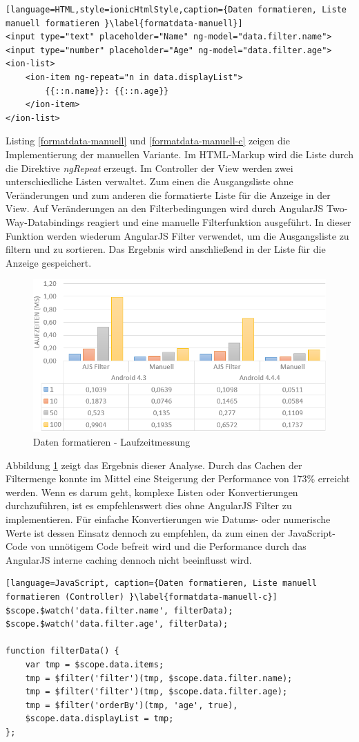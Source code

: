 \begin{lstlisting}[language=HTML,style=ionicHtmlStyle,caption={Daten formatieren, Liste manuell formatieren }\label{formatdata-manuell}]
<input type="text" placeholder="Name" ng-model="data.filter.name">
<input type="number" placeholder="Age" ng-model="data.filter.age">
<ion-list>
	<ion-item ng-repeat="n in data.displayList">
		{{::n.name}}: {{::n.age}}
	</ion-item>
</ion-list>
\end{lstlisting}  
Listing \ref{formatdata-manuell} und \ref{formatdata-manuell-c} zeigen die Implementierung der manuellen Variante. Im HTML-Markup wird die Liste durch die Direktive \emph{ngRepeat} erzeugt. Im Controller der View werden zwei unterschiedliche Listen verwaltet. Zum einen die Ausgangsliste ohne Veränderungen und zum anderen die formatierte Liste für die Anzeige in der View. Auf Veränderungen an den Filterbedingungen wird durch AngularJS Two-Way-Databindings reagiert und eine manuelle Filterfunktion ausgeführt. In dieser Funktion werden wiederum AngularJS Filter verwendet, um die Ausgangsliste zu filtern und zu sortieren. Das Ergebnis wird anschließend in der Liste für die Anzeige gespeichert.
\begin{figure}[h]
	\centering
	\includegraphics[scale=0.5]{Bilder/Diagramme/Filter.png}
	\caption{Daten formatieren - Laufzeitmessung}
	\label{filter-measurement}
\end{figure}
Abbildung \ref{filter-measurement} zeigt das Ergebnis dieser Analyse. Durch das Cachen der Filtermenge konnte im Mittel eine Steigerung der Performance von 173\% erreicht werden. Wenn es darum geht, komplexe Listen oder Konvertierungen durchzuführen, ist es empfehlenswert dies ohne AngularJS Filter zu implementieren. Für einfache Konvertierungen wie Datums- oder numerische Werte ist dessen Einsatz dennoch zu empfehlen, da zum einen der JavaScript-Code von unnötigem Code befreit wird und die Performance durch das AngularJS interne caching dennoch nicht beeinflusst wird. 
\begin{lstlisting}[language=JavaScript, caption={Daten formatieren, Liste manuell formatieren (Controller) }\label{formatdata-manuell-c}]
$scope.$watch('data.filter.name', filterData);
$scope.$watch('data.filter.age', filterData);

function filterData() {
	var tmp = $scope.data.items;
	tmp = $filter('filter')(tmp, $scope.data.filter.name);
	tmp = $filter('filter')(tmp, $scope.data.filter.age);
	tmp = $filter('orderBy')(tmp, 'age', true),
	$scope.data.displayList = tmp;
};
\end{lstlisting}

